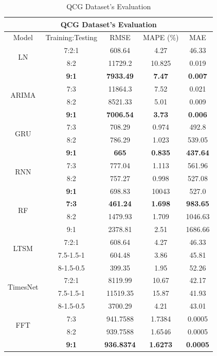 \documentclass{ieeeojies}
\begin{document}
\begin{table}[H]
  \centering
  \begin{tabular}{|c|c|c|c|c|}
         \hline
         \multicolumn{5}{|c|}{\textbf{QCG Dataset's Evaluation}}\\
         \hline
         \centering Model & Training:Testing & RMSE & MAPE (\%) & MAE\\
         \hline
         \multirow{2}{*}{LN} & 7:2:1 & 608.64 & 4.27 & 46.33 \\ & 8:2 & 11729.2 & 10.825 & 0.019 \\ & \textbf{9:1} & \textbf{7933.49} & \textbf{7.47} & \textbf{0.007}\\
         \hline
         \multirow{2}{*}{ARIMA} & 7:3&11864.3&7.52&0.021\\ & 8:2&8521.33&5.01&0.009 \\ & \textbf{9:1} & \textbf{7006.54} & \textbf{3.73} & \textbf{0.006}\\
         \hline
         \multirow{2}{*}{GRU} & 7:3 & 708.29 & 0.974 & 492.8\\ & 8:2 & 786.29 & 1.023 & 539.05  \\ & \textbf{9:1} & \textbf{665}	& \textbf{0.835} &  \textbf{437.64} \\
         \hline
         \multirow{2}{*}{RNN} & 7:3 &  777.04 &  1.113 & 561.96 \\ & 8:2 &  757.27 & 0.998 &  527.08\\ & \textbf{9:1} & 698.83 & 10043 & 527.0\\
         \hline
         \multirow{2}{*}{RF} & \textbf{7:3}	& \textbf{461.24} & \textbf{1.698} & \textbf{983.65} \\ & 8:2 & 1479.93 & 1.709 & 1046.63 \\ & 9:1 & 2378.81 &  2.51 & 1686.66\\
         \hline
         \multirow{2}{*}{LTSM} & 7:2:1 & 608.64 & 4.27 & 46.33 \\ & 7.5-1.5-1 & 604.48 & 3.86 & 45.81 \\ & 8-1.5-0.5 & 399.35	&1.95&52.26\\
         \hline
         \multirow{2}{*}{TimesNet} & 7:2:1 & 8119.99 & 10.67 & 42.17 \\ & 7.5-1.5-1 & 11519.35 & 15.87 & 41.93 \\ & 8-1.5-0.5 & 3700.29	& 4.21 &43.01\\
         \hline
         \multirow{2}{*}{FFT} & 7:3 & 941.7588 &  1.7384 &  0.0005 \\ & 8:2 & 939.7588 &  1.6546 &  0.0005 \\ & \textbf{9:1} & \textbf{936.8374} & \textbf{1.6273} & \textbf{0.0005}\\
         \hline
    \end{tabular}
    \caption{QCG Dataset's Evaluation}
    \label{vcbresult}
\end{table}
\end{document}
